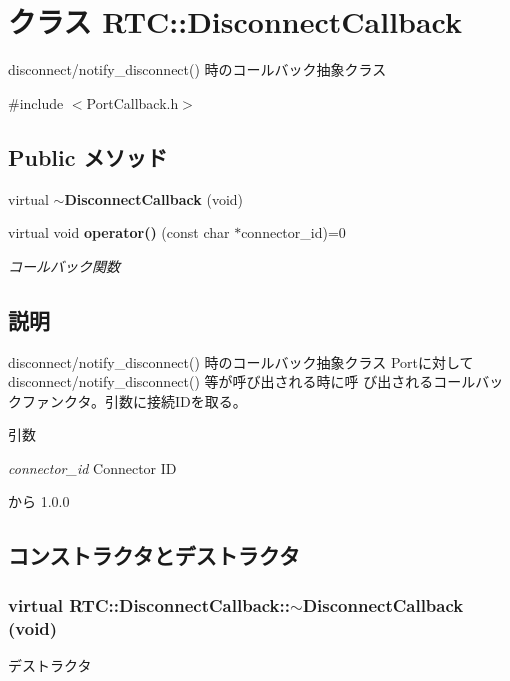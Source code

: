 \section{クラス RTC::DisconnectCallback}
\label{classRTC_1_1DisconnectCallback}


disconnect/notify\_\-disconnect() 時のコールバック抽象クラス  




{\ttfamily \#include $<$PortCallback.h$>$}

\subsection*{Public メソッド}
\begin{DoxyCompactItemize}
\item 
virtual {\bf $\sim$DisconnectCallback} (void)
\item 
virtual void {\bf operator()} (const char $\ast$connector\_\-id)=0
\begin{DoxyCompactList}\small\item\em コールバック関数 \item\end{DoxyCompactList}\end{DoxyCompactItemize}


\subsection{説明}
disconnect/notify\_\-disconnect() 時のコールバック抽象クラス Portに対してdisconnect/notify\_\-disconnect() 等が呼び出される時に呼 び出されるコールバックファンクタ。引数に接続IDを取る。


\begin{DoxyParams}{引数}
\item[{\em connector\_\-id}]Connector ID\end{DoxyParams}
\begin{DoxySince}{から}
1.0.0 
\end{DoxySince}


\subsection{コンストラクタとデストラクタ}
\subsubsection[{$\sim$DisconnectCallback}]{\setlength{\rightskip}{0pt plus 5cm}virtual RTC::DisconnectCallback::$\sim$DisconnectCallback (void)\hspace{0.3cm}{\ttfamily  [inline, virtual]}}\label{classRTC_1_1DisconnectCallback_aee020344969e3996b91d6bf3873c9aab}
デストラクタ 

